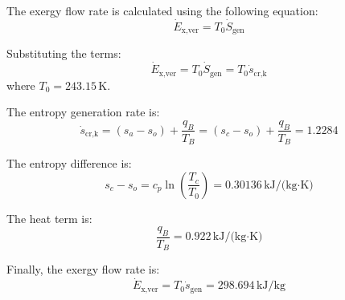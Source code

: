 The exergy flow rate is calculated using the following equation:  
\[
\dot{E}_{\text{x,ver}} = T_0 \dot{S}_{\text{gen}}
\]  

Substituting the terms:  
\[
\dot{E}_{\text{x,ver}} = T_0 \dot{S}_{\text{gen}} = T_0 \dot{s}_{\text{cr,k}}
\]  
where \( T_0 = 243.15 \, \text{K} \).  

The entropy generation rate is:  
\[
\dot{s}_{\text{cr,k}} = (s_a - s_o) + \frac{q_B}{T_B} = (s_c - s_o) + \frac{q_B}{T_B} = 1.2284
\]  

The entropy difference is:  
\[
s_c - s_o = c_p \ln \left( \frac{T_c}{T_0} \right) = 0.30136 \, \text{kJ/(kg·K)}
\]  

The heat term is:  
\[
\frac{q_B}{T_B} = 0.922 \, \text{kJ/(kg·K)}
\]  

Finally, the exergy flow rate is:  
\[
\dot{E}_{\text{x,ver}} = T_0 \dot{s}_{\text{gen}} = 298.694 \, \text{kJ/kg}
\]
